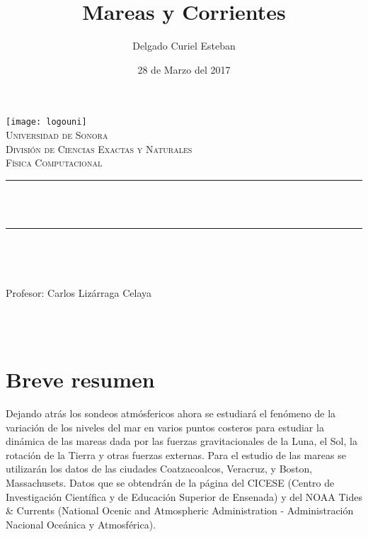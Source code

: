 \documentclass[12pt]{article}
\title{Mareas y Corrientes}		%
\author{\centering Delgado Curiel Esteban}											%
\date{28 de Marzo del 2017} %
\makeatletter
\let\thetitle\@title
\let\theauthor\@author
\let\thedate\@date
\makeatother
\begin{document}

\begin{titlepage}
	\begin{centering}
    
    \vspace*{0.5 cm}
    \texttt{[image: logouni]}\\[0.5 cm]	%
    \textsc{\Large Universidad de Sonora}\\[1.0 cm]	%
	\textsc{\Large División de Ciencias Exactas y Naturales}\\[0.5 cm]				%
	\textsc{\large Física Computacional}\\[0.5 cm]				%
	\rule{\linewidth}{0.2 mm} \\[0.4 cm]
	{ \huge \bfseries \thetitle}\\
	\rule{\linewidth}{0.2 mm} \\[0.5 cm]
	
	\begin{minipage}{\textwidth}
		\begin{flushleft} 
			\emph{\Large} \large \\
			\theauthor
			\end{flushleft}
	
		\begin{flushleft} 
			{Profesor:} \large \centering Carlos Lizárraga Celaya	
			\end{flushleft}
	\end{minipage}\\[1 cm]
	{\large \thedate}\\[2 cm]
 
	\vfill
    \end{centering}
    \end{titlepage}
    
\section*{Breve resumen}
Dejando atrás los sondeos atmósfericos ahora se estudiará el fenómeno de la variación de los niveles del mar en varios puntos costeros para estudiar la dinámica de las mareas dada por las fuerzas gravitacionales de la Luna, el Sol, la rotación de la Tierra y otras fuerzas externas. Para el estudio de las mareas se utilizarán los datos de las ciudades Coatzacoalcos, Veracruz, y Boston, Massachusets. Datos que se obtendrán de la página del CICESE (Centro de Investigación Científica y de Educación Superior de Ensenada) y del NOAA Tides \& Currents (National Ocenic and Atmospheric Administration - Administración Nacional Oceánica y Atmosférica).
\end{document}
